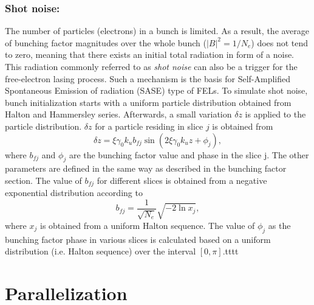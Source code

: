 \subsubsection{Shot noise:}

The number of particles (electrons) in a bunch is limited.
%
As a result, the average of bunching factor magnitudes over the whole bunch ($|B|^2=1/N_e$) does not tend to zero, meaning that there exists an initial total radiation in form of a noise.
%
This radiation commonly referred to as \emph{shot noise} can also be a trigger for the free-electron lasing process.
%
Such a mechanism is the basis for Self-Amplified Spontaneous Emission of radiation (SASE) type of FELs.
%
To simulate shot noise, bunch initialization starts with a uniform particle distribution obtained from Halton and Hammersley series.
%
Afterwards, a small variation $\delta z$ is applied to the particle distribution.
%
$\delta z$ for a particle residing in slice $j$ is obtained from
%
\begin{equation}
\label{bunchingFactor}
\delta z = \xi \gamma_0 k_u b_{fj} \sin (2 \xi \gamma_0 k_u z + \phi_j),
\end{equation}
%
where $b_{fj}$ and $\phi_j$ are the bunching factor value and phase in the slice j.
%
The other parameters are defined in the same way as described in the bunching factor section.
%
The value of $b_{fj}$ for different slices is obtained from a negative exponential distribution according to
%
\begin{equation}
\label{negativeExponential}
b_{fj} = \frac{1}{\sqrt{N_e}} \sqrt{-2 \ln x_j},
\end{equation}
%
where $x_j$ is obtained from a uniform Halton sequence.
%
The value of $\phi_j$ as the bunching factor phase in various slices is calculated based on a uniform distribution (i.e. Halton sequence) over the interval $[0,\pi]$.tttt 

\section{Parallelization}

